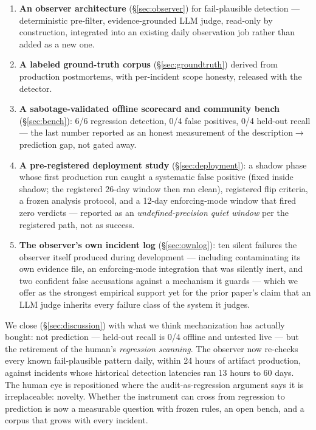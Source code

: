 \documentclass[11pt]{article}
\begin{document}
\begin{enumerate}
\item \textbf{An observer architecture} (\S\ref{sec:observer}) for
  fail-plausible detection --- deterministic pre-filter,
  evidence-grounded LLM judge, read-only by construction, integrated
  into an existing daily observation job rather than added as a new
  one.
\item \textbf{A labeled ground-truth corpus} (\S\ref{sec:groundtruth})
  derived from production postmortems, with per-incident scope honesty,
  released with the detector.
\item \textbf{A sabotage-validated offline scorecard and community
  bench} (\S\ref{sec:bench}): 6/6 regression detection, 0/4 false
  positives, 0/4 held-out recall --- the last number reported as an
  honest measurement of the description$\rightarrow$prediction gap, not
  gated away.
\item \textbf{A pre-registered deployment study}
  (\S\ref{sec:deployment}): a shadow phase whose first production run
  caught a systematic false positive (fixed inside shadow; the
  registered 26-day window then ran clean), registered flip criteria, a
  frozen analysis protocol, and a 12-day enforcing-mode window that
  fired zero verdicts --- reported as an \emph{undefined-precision
  quiet window} per the registered path, not as success.
\item \textbf{The observer's own incident log} (\S\ref{sec:ownlog}):
  ten silent failures the observer itself produced during
  development --- including contaminating its own evidence file, an
  enforcing-mode integration that was silently inert, and two confident
  false accusations against a mechanism it guards --- which we offer
  as the strongest empirical support yet for the prior paper's claim
  that an LLM judge inherits every failure class of the system it
  judges.
\end{enumerate}

We close (\S\ref{sec:discussion}) with what we think mechanization has
actually bought: not prediction --- held-out recall is 0/4 offline and
untested live --- but the retirement of the human's \emph{regression
scanning}. The observer now re-checks every known fail-plausible
pattern daily, within 24 hours of artifact production, against
incidents whose historical detection latencies ran 13 hours to 60 days.
The human eye is repositioned where the audit-as-regression argument
says it is irreplaceable: novelty. Whether the instrument can cross
from regression to prediction is now a measurable question with frozen
rules, an open bench, and a corpus that grows with every incident.
\end{document}
